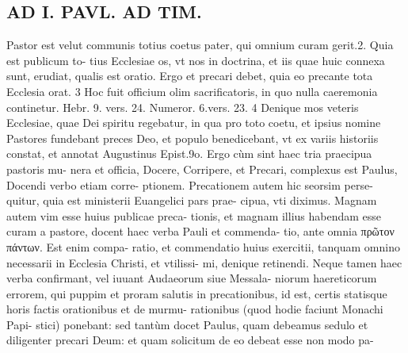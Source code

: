 \documentclass{article}
\begin{document}
\begin{pages}
\section*{AD I. PAVL. AD TIM. }
\marginpar{[ p.40 ]}\pstart Pastor est velut communis totius coetus pater, qui omnium curam gerit.2. Quia est publicum to- tius Ecclesiae os, vt nos in doctrina, et iis quae huic connexa sunt, erudiat, qualis est oratio. Ergo et precari debet, quia eo precante tota Ecclesia orat. 3 Hoc fuit officium olim sacrificatoris, in quo nulla caeremonia continetur. Hebr. 9. vers. 24. Numeror. 6.vers. 23. 4 Denique mos veteris Ecclesiae, quae Dei spiritu regebatur, in qua pro toto coetu, et ipsius nomine Pastores fundebant preces Deo, et populo benedicebant, vt ex variis historiis constat, et annotat Augustinus Epist.9o.  \pend\pstart Ergo cùm sint haec tria praecipua pastoris mu- nera et officia, Docere, Corripere, et Precari, complexus est Paulus, Docendi verbo etiam corre- ptionem. Precationem autem hic seorsim perse- quitur, quia est ministerii Euangelici pars prae- cipua, vti diximus.  \pend\pstart Magnam autem vim esse huius publicae preca- tionis, et magnam illius habendam esse curam a pastore, docent haec verba Pauli et commenda- tio, ante omnia πρῶτον πάντων. Est enim compa- ratio, et commendatio huius exercitii, tanquam omnino necessarii in Ecclesia Christi, et vtilissi- mi, denique retinendi. Neque tamen haec verba confirmant, vel iuuant Audaeorum siue Messala- niorum haereticorum errorem, qui puppim et proram salutis in precationibus, id est, certis statisque horis factis orationibus et de murmu- rationibus (quod hodie faciunt Monachi Papi- stici) ponebant: sed tantùm docet Paulus, quam debeamus sedulo et diligenter precari Deum: et quam solicitum de eo debeat esse non modo pa-  \pend

\end{pages}
\end{document}
